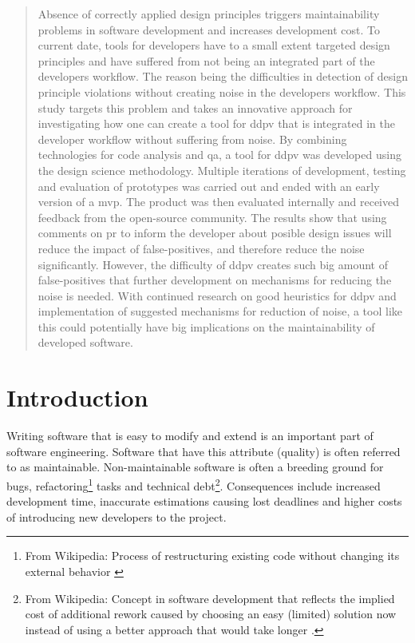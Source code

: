 \documentclass{report}
\begin{document}
\begin{abstract}
	Absence of correctly applied design principles triggers maintainability problems in software development and increases development cost. To current date, tools for developers have to a small extent targeted design principles and have suffered from not being an integrated part of the developers workflow. The reason being the difficulties in detection of design principle violations without creating noise in the developers workflow. This study targets this problem and takes an innovative approach for investigating how one can create a tool for \gls{ddpv} that is integrated in the developer workflow without suffering from noise. By combining technologies for code analysis and \gls{qa}, a tool for \gls{ddpv} was developed using the design science methodology. Multiple iterations of development, testing and evaluation of prototypes was carried out and ended with an early version of a \acrfull{mvp}. The product was then evaluated internally and received feedback from the open-source community. The results show that using comments on \gls{pr} to inform the developer about posible design issues will reduce the impact of false-positives, and therefore reduce the noise significantly. However, the difficulty of \gls{ddpv} creates such big amount of false-positives that further development on mechanisms for reducing the noise is needed. With continued research on good heuristics for \gls{ddpv} and implementation of suggested mechanisms for reduction of noise, a tool like this could potentially have big implications on the maintainability of developed software. 
	
\end{abstract}


\clearpage



\tableofcontents
\clearpage
\chapter{Introduction}






Writing software that is easy to modify and extend is an important part of software engineering. Software that have this attribute (quality) is often referred to as maintainable. Non-maintainable software is often a breeding ground for bugs, refactoring\footnote{From Wikipedia: Process of restructuring existing code without changing its external behavior \cite{refactoring}} tasks and technical debt\footnote{From Wikipedia: Concept in software development that reflects the implied cost of additional rework caused by choosing an easy (limited) solution now instead of using a better approach that would take longer \cite{technicalDebt}.}. Consequences include increased development time, inaccurate estimations causing lost deadlines and higher costs of introducing new developers to the project.
\end{document}
